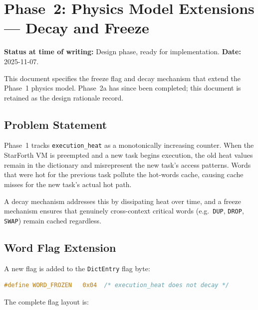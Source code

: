 
\section{Phase~2: Physics Model Extensions — Decay and Freeze}
\label{sec:phase2-decay-freeze}

\textbf{Status at time of writing:} Design phase, ready for implementation.
\textbf{Date:} 2025-11-07.

This document specifies the freeze flag and decay mechanism that extend the
Phase~1 physics model. Phase~2a has since been completed; this document is
retained as the design rationale record.

\subsection{Problem Statement}

Phase~1 tracks \texttt{execution\_heat} as a monotonically increasing
counter. When the StarForth VM is preempted and a new task begins execution,
the old heat values remain in the dictionary and misrepresent the new task's
access patterns. Words that were hot for the previous task pollute the
hot-words cache, causing cache misses for the new task's actual hot path.

A decay mechanism addresses this by dissipating heat over time, and a freeze
mechanism ensures that genuinely cross-context critical words
(e.g.\ \texttt{DUP}, \texttt{DROP}, \texttt{SWAP}) remain cached regardless.

\subsection{Word Flag Extension}

A new flag is added to the \texttt{DictEntry} flag byte:

\begin{lstlisting}[language=C]
#define WORD_FROZEN   0x04  /* execution_heat does not decay */
\end{lstlisting}

The complete flag layout is:

